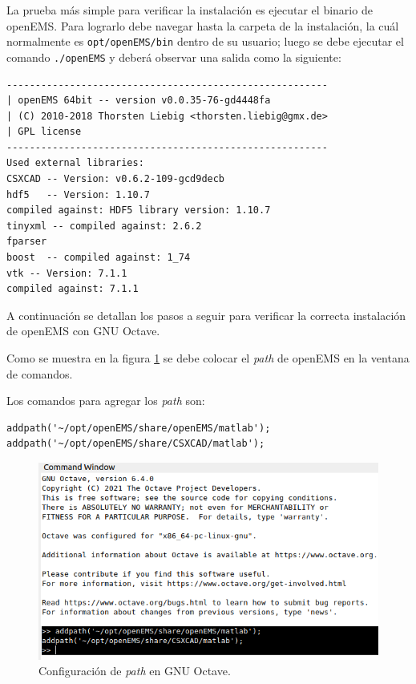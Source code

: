 \documentclass[
    11pt,
    spanish,
	a4paper
]{article}
\begin{document}
La prueba más simple para verificar la instalación es ejecutar el binario de
openEMS.
Para lograrlo debe navegar hasta la carpeta de la instalación, la cuál
normalmente es \texttt{opt/openEMS/bin} dentro de su usuario; luego se debe ejecutar
el comando \texttt{./openEMS} y deberá observar una salida como la siguiente:

\begin{verbatim}
--------------------------------------------------------
| openEMS 64bit -- version v0.0.35-76-gd4448fa
| (C) 2010-2018 Thorsten Liebig <thorsten.liebig@gmx.de>
| GPL license
--------------------------------------------------------
Used external libraries:
CSXCAD -- Version: v0.6.2-109-gcd9decb
hdf5   -- Version: 1.10.7
compiled against: HDF5 library version: 1.10.7
tinyxml -- compiled against: 2.6.2
fparser
boost  -- compiled against: 1_74
vtk -- Version: 7.1.1
compiled against: 7.1.1
\end{verbatim}

A continuación se detallan los pasos a seguir para verificar la correcta
instalación de openEMS con GNU Octave.

Como se muestra en la figura \ref{fig:octavepath} se debe colocar el \emph{path}
de openEMS en la ventana de comandos.

Los comandos para agregar los \emph{path} son:

\begin{verbatim}
addpath('~/opt/openEMS/share/openEMS/matlab');
addpath('~/opt/openEMS/share/CSXCAD/matlab');
\end{verbatim}

\begin{figure}[htbp]
	\centering
	\includegraphics[width=\textwidth]{./img/octavepath.png}
	\caption{Configuración de \emph{path} en GNU Octave.}
	\label{fig:octavepath}
\end{figure}
\end{document}

